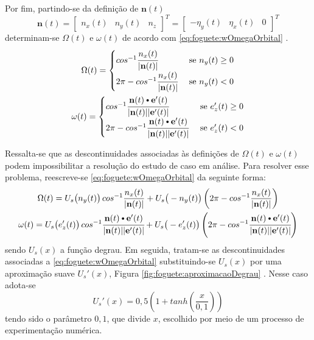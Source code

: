 Por fim, partindo-se da definição de $ \mathbf{n}(t) $
%
\begin{equation}
	\mathbf{n}(t) = \begin{bmatrix} n_x(t) & n_y(t) & n_z \end{bmatrix}^T = \begin{bmatrix} -\eta_y(t) & \eta_x(t) & 0 \end{bmatrix}^T 
\end{equation}
%
determinam-se $ \Omega(t) $ e $ \omega(t) $ de acordo com \eqref{eq:foguete:wOmegaOrbital} \cite{schwarz_cartesian_2017}.
%
\begin{equation}
	\label{eq:foguete:wOmegaOrbital}
	\begin{gathered}
		\Omega(t) = \begin{cases}
		cos^{-1} \cfrac{n_x(t)}{|\mathbf{n}(t)|} &\text{ se } n_y(t) \geq 0 \\
		2 \pi - cos^{-1} \cfrac{n_x(t)}{|\mathbf{n}(t)|} &\text{ se } n_y(t) < 0
		\end{cases} \\
		\omega(t) = \begin{cases}
		cos^{-1} \cfrac{\mathbf{n}(t) \bigcdot \mathbf{e'}(t)}{|\mathbf{n}(t)||\mathbf{e'}(t)|} &\text{ se } e'_z(t) \geq 0 \\
		2 \pi - cos^{-1} \cfrac{\mathbf{n}(t) \bigcdot \mathbf{e'}(t)}{|\mathbf{n}(t)||\mathbf{e'}(t)|} &\text{ se } e'_z(t) < 0
		\end{cases}
	\end{gathered}
\end{equation}

Ressalta-se que as descontinuidades associadas às definições de $ \Omega(t) $ e $ \omega(t) $ podem impossibilitar a resolução do estudo de caso em análise. Para resolver esse problema, reescreve-se \eqref{eq:foguete:wOmegaOrbital} da seguinte forma:
%
\begin{equation}
	\begin{gathered}
		\Omega(t) = U_s\big( n_y(t) \big) \, cos^{-1} \frac{n_x(t)}{|\mathbf{n}(t)|} + U_s\big( -n_y(t) \big) \left( 2 \pi - cos^{-1} \frac{n_x(t)}{|\mathbf{n}(t)|} \right) \\ 
		\omega(t) = U_s\big( e'_z(t) \big) \, cos^{-1} \cfrac{\mathbf{n}(t) \bigcdot \mathbf{e'}(t)}{|\mathbf{n}(t)||\mathbf{e'}(t)|} + U_s\big( -e'_z(t) \big) \left( 2 \pi - cos^{-1} \cfrac{\mathbf{n}(t) \bigcdot \mathbf{e'}(t)}{|\mathbf{n}(t)||\mathbf{e'}(t)|} \right) \\ 
	\end{gathered}
\end{equation}
%
sendo $ U_s(x) $ a função degrau. Em seguida, tratam-se as descontinuidades associadas a \eqref{eq:foguete:wOmegaOrbital} substituindo-se $ U_s(x) $ por uma aproximação suave $ U_s'(x) $, Figura \ref{fig:foguete:aproximacaoDegrau} \cite{becerra_psopt_2019}. Nesse caso adota-se
%
\begin{equation}
	\label{eq:foguete:apxDegrau}
	U_s'(x) = 0,5 \left( 1 + tanh \left( \frac{x}{0,1} \right) \right)
\end{equation}
%
tendo sido o parâmetro $ 0,1 $, que divide $ x $, escolhido por meio de um processo de experimentação numérica. 

